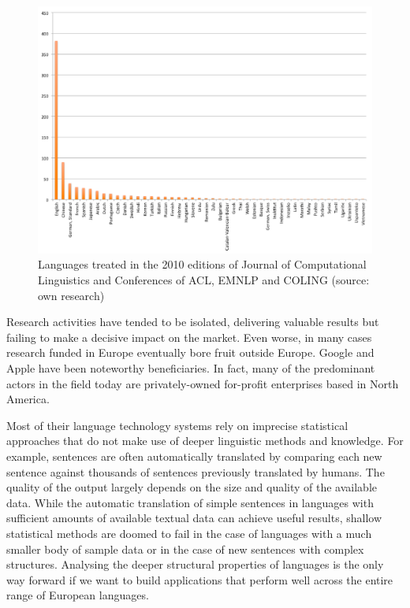 \begin{multicols}{2}
\begin{figure}[htb]
  \center
  \includegraphics[width=\textwidth]{images/Languages-in-LT-Research}
  \caption{Languages treated in the 2010 editions of Journal of Computational Linguistics and Conferences of ACL, EMNLP and COLING (source: own research)}
  \label{fig:languages-in-research}
\end{figure}

Research activities have tended to be isolated, delivering valuable results but failing to make a decisive impact on the market. Even worse, in many cases research funded in Europe eventually bore fruit outside Europe. Google and Apple have been noteworthy beneficiaries. In fact, many of the predominant actors in the field today are privately-owned for-profit enterprises based in North America.

Most of their language technology systems rely on imprecise statistical approaches that do not make use of deeper linguistic methods and knowledge. For example, sentences are often automatically translated by comparing each new sentence against thousands of sentences previously translated by humans. The quality of the output largely depends on the size and quality of the available data. While the automatic translation of simple sentences in languages with sufficient amounts of available textual data can achieve useful results, shallow statistical methods are doomed to fail in the case of languages with a much smaller body of sample data or in the case of new sentences with complex structures. Analysing the deeper structural properties of languages is the only way forward if we want to build applications that perform well across the entire range of European languages.


\end{multicols}
